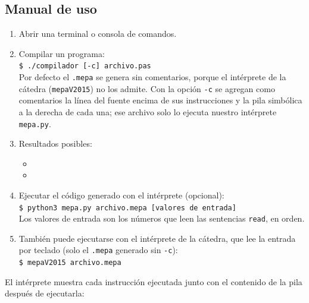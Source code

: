 \documentclass[12pt]{article}
\begin{document}
\subsection{Manual de uso}


\begin{enumerate}
    \item Abrir una terminal o consola de comandos.
    \item Compilar un programa:\\
    \verb|$ ./compilador [-c] archivo.pas|\\
    Por defecto el \texttt{.mepa} se genera sin comentarios, porque el intérprete de la cátedra (\texttt{mepaV2015}) no los admite. Con la opción \texttt{-c} se agregan como comentarios la línea del fuente encima de sus instrucciones y la pila simbólica a la derecha de cada una; ese archivo solo lo ejecuta nuestro intérprete \texttt{mepa.py}.
    \item Resultados posibles:
    \begin{itemize}
        \item {}
        \item {}
    \end{itemize}
    \item Ejecutar el código generado con el intérprete (opcional):\\
    \verb|$ python3 mepa.py archivo.mepa [valores de entrada]|\\
    Los valores de entrada son los números que leen las sentencias \texttt{read}, en orden.
    \item También puede ejecutarse con el intérprete de la cátedra, que lee la entrada por teclado (solo el \texttt{.mepa} generado sin \texttt{-c}):\\
    \verb|$ mepaV2015 archivo.mepa|
\end{enumerate}

El intérprete muestra cada instrucción ejecutada junto con el contenido de la pila después de ejecutarla:
\end{document}
